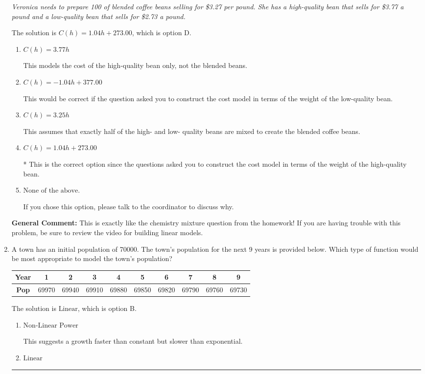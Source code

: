 \documentclass{extbook}[14pt]
\newcommand{\litem}[1]{\item #1

\rule{\textwidth}{0.4pt}}
\begin{document}
\begin{enumerate}
{\begin{center}
    \textit{ Veronica needs to prepare 100 of blended coffee beans selling for \$3.27 per pound. She has a high-quality bean that sells for \$3.77 a pound and a low-quality bean that sells for \$2.73 a pound. }
\end{center}
The solution is \( C(h) = 1.04 h + 273.00 \), which is option D.\begin{enumerate}[label=\Alph*.]
\item \( C(h) = 3.77 h \)

This models the cost of the high-quality bean only, not the blended beans.
\item \( C(h) = -1.04 h + 377.00 \)

This would be correct if the question asked you to construct the cost model in terms of the weight of the low-quality bean.
\item \( C(h) = 3.25 h \)

This assumes that exactly half of the high- and low- quality beans are mixed to create the blended coffee beans.
\item \( C(h) = 1.04 h + 273.00 \)

* This is the correct option since the questions asked you to construct the cost model in terms of the weight of the high-quality bean.
\item \( \text{None of the above.} \)

If you chose this option, please talk to the coordinator to discuss why.
\end{enumerate}

\textbf{General Comment:} This is exactly like the chemistry mixture question from the homework! If you are having trouble with this problem, be sure to review the video for building linear models.
}
\litem{
A town has an initial population of 70000. The town's population for the next 9 years is provided below. Which type of function would be most appropriate to model the town's population?


\begin{tabular}{c|c|c|c|c|c|c|c|c|c}
\textbf{Year} &1 &2 &3 &4 &5 &6 &7 &8 &9\tabularnewline \hline
\textbf{Pop} &69970 &69940 &69910 &69880 &69850 &69820 &69790 &69760 &69730\end{tabular}The solution is \( \text{Linear} \), which is option B.\begin{enumerate}[label=\Alph*.]
\item \( \text{Non-Linear Power} \)

This suggests a growth faster than constant but slower than exponential.
\item \( \text{Linear} \)


\end{enumerate}}
\end{enumerate}
\end{document}
